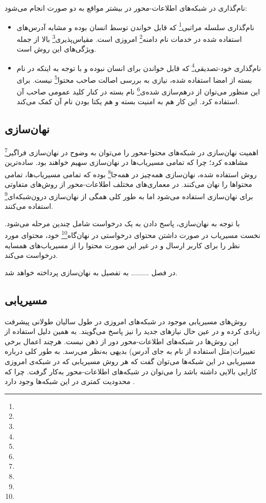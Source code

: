 نام‌گذاری در شبکه‌های اطلاعات-محور در بیشتر مواقع به دو صورت انجام می‌شود:

\begin{itemize}
	\item نام‌گذاری سلسله مراتبی\footnote{}
	که قابل خواندن توسط انسان بوده و مشابه آدرس‌های استفاده شده در خدمات نام دامنه\footnote{} امروزی است. مقیاس‌پذیری\footnote{} بالا از جمله ویژگی‌های این روش است.
	\item نام‌گذاری خود-تصدیقی\footnote{}
	که قابل خواندن برای انسان نبوده و با توجه به اینکه در نام بسته از امضا استفاده شده، نیازی به بررسی اصالت صاحب محتوا\footnote{} نیست. برای این منظور می‌توان از درهم‌سازی شده‌ی\footnote{} نام بسته در کنار کلید عمومی صاحب آن استفاده کرد. این کار هم به امنیت بسته و هم یکتا بودن نام آن کمک می‌کند.
	
\end{itemize}


\subsection{نهان‌سازی}
اهمیت نهان‌سازی در شبکه‌های محتوا-محور را می‌توان به وضوح در نهان‌سازی فراگیر\footnote{} مشاهده کرد؛ چرا که تمامی مسیریاب‌ها در نهان‌سازی سهیم خواهند بود. ساده‌ترین روش استفاده شده، نهان‌سازی همه‌چیز در همه‌جا\footnote{} بوده که تمامی مسیریاب‌ها، تمامی محتواها را نهان می‌کنند. در معماری‌های مختلف اطلاعات-محور از روش‌های متفاوتی برای نهان‌سازی استفاده می‌شود اما به طور کلی همگی از نهان‌سازی درون‌شبکه‌ای\footnote{} استفاده می‌کنند.

با توجه به نهان‌سازی، پاسخ دادن به یک درخواست شامل چندین مرحله می‌شود. نخست مسیریاب در صورت داشتن محتوای درخواستی در نهان‌گاه\footnote{} خود، محتوای مورد نظر را برای کاربر ارسال و در غیر این صورت محتوا را از مسیریاب‌های همسایه درخواست می‌کند.

 در فصل ......... به تفصیل به نهان‌سازی پرداخته خواهد شد.

\subsection{مسیریابی}
روش‌های مسیریابی موجود در شبکه‌های امروزی در طول سالیان طولانی پیشرفت زیادی کرده و در عین حال نیازهای جدید را نیز پاسخ می‌گویند. به همین دلیل استفاده از این روش‌ها در شبکه‌های اطلاعات-محور دور از ذهن نیست. هرچند اعمال برخی تغییرات(مثل استفاده از نام به جای آدرس) بدیهی به‌نظر می‌رسد. به طور کلی درباره مسیریابی در این شبکه‌ها می‌توان گفت که هر روش مسیر‌یابی که در شبکه‌ی امروزی کارایی بالایی داشته باشد را می‌توان در شبکه‌های اطلاعات-محور به‌کار گرفت. چرا که محدودیت کمتری در این شبکه‌ها وجود دارد \cite{ndn}.

